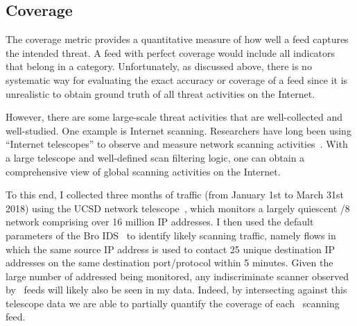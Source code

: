 \subsection{Coverage}
\label{sec:completeness}

The coverage metric provides a quantitative measure of how well a
feed captures the intended threat. A feed with perfect
coverage would include all indicators that belong in a category.
Unfortunately, as discussed above, there is no systematic way for
evaluating the exact accuracy or coverage of a feed since it is unrealistic
to obtain ground truth of all threat activities on the Internet.

However, there are some large-scale threat activities that are
well-collected and well-studied. One example is Internet
scanning. Researchers have long been using ``Internet telescopes'' to
observe and measure network scanning
activities~\cite{benson2015leveraging, durumeric2014internet,
  pang2004characteristics}.  With a large telescope and well-defined
scan filtering logic, one can obtain a comprehensive view of global
scanning activities on the Internet.

To this end, I collected three months of traffic (from January 1st to
March 31st 2018) using the UCSD network telescope~\cite{telescope},
which monitors a largely quiescent /8 network comprising over 16
million IP addresses.  I then used the default parameters of the Bro
IDS~\cite{BroNetwork} to identify likely scanning traffic, namely
flows in which the same source IP address is used to contact 25 unique
destination IP addresses on the same destination port/protocol within
5 minutes. Given the large number of addressed being monitored, any
indiscriminate scanner observed by \ti\ feeds will likely also be seen
in my data.  Indeed, by intersecting against this telescope data we
are able to partially quantify the coverage of each \ti\ scanning feed.



